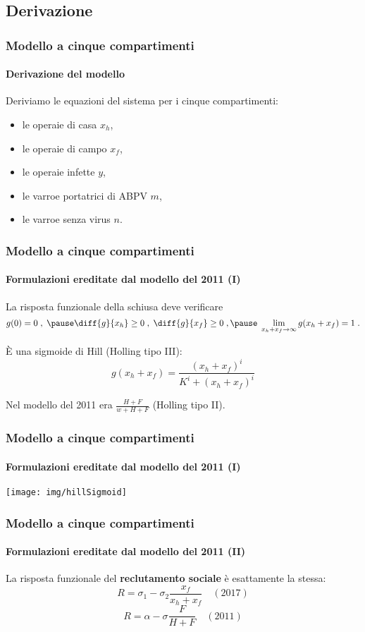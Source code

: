 \documentclass[]{beamer}
\begin{document}
\subsection{Derivazione}


\begin{frame}
    \frametitle{Modello a cinque compartimenti}
    \framesubtitle{Derivazione del modello}

    Deriviamo le equazioni del sistema per i cinque compartimenti:
    \begin{itemize}
        \item \pause le operaie di casa $x_h$,
        \item \pause le operaie di campo $x_f$,
        \item \pause le operaie infette $y$,
        \item \pause le varroe portatrici di ABPV $m$,
        \item \pause le varroe senza virus $n$.
    \end{itemize}
\end{frame}

\begin{frame}
    \frametitle{Modello a cinque compartimenti}
    \framesubtitle{Formulazioni ereditate dal modello del 2011 (I)}

    La risposta funzionale della schiusa deve verificare
    $$g(0)=0 \; , \; \pause \diff{g}{x_h} \geq 0 \; , \; \diff{g}{x_f} \geq 0 \; , %
    \pause \; \lim_{x_h+x_f \to \infty} g(x_h+x_f)=1 \; .$$

    \pause
    È una sigmoide di Hill (Holling tipo III):
    $$g(x_h + x_f) = \frac{ (x_h+x_f)^i }{ K^i + (x_h+x_f)^i }$$

    \pause Nel modello del 2011 era $\frac{H+F}{w+H+F}$ (Holling tipo II).
\end{frame}

\begin{frame}
    \frametitle{Modello a cinque compartimenti}
    \framesubtitle{Formulazioni ereditate dal modello del 2011 (I)}

    \begin{center}
            \texttt{[image: img/hillSigmoid]}
    \end{center}
\end{frame}

\begin{frame}
    \frametitle{Modello a cinque compartimenti}
    \framesubtitle{Formulazioni ereditate dal modello del 2011 (II)}

    La risposta funzionale del \textbf{reclutamento sociale} è esattamente la stessa:
    $$R = \sigma_1 - \sigma_2 \frac{x_f}{x_h+x_f} \quad (2017)$$
    \pause
    $$R = \alpha - \sigma \frac{F}{H+F} \quad (2011)$$
\end{frame}
\end{document}
